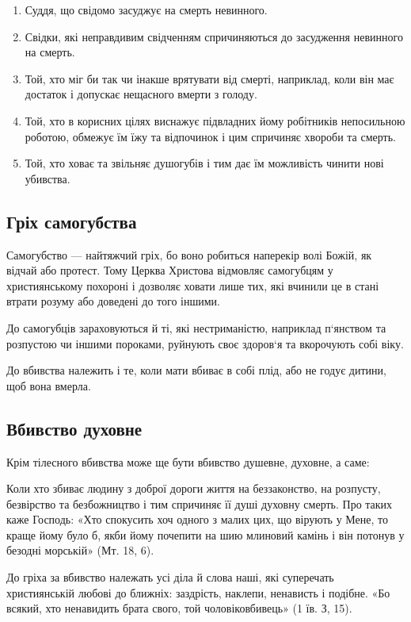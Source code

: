 \documentclass[main.tex]{subfiles}
\begin{document}
\begin{enumerate}
    \item Суддя, що свідомо засуджує на смерть невинного.
    \item Свідки, які неправдивим свідченням спричиняються до засудження невинного на смерть.
    \item Той, хто міг би так чи інакше врятувати від смерті, наприклад, коли він має достаток і допускає нещасного вмерти з голоду.
    \item Той, хто в корисних цілях виснажує підвладних йому робітників непосильною роботою, обмежує їм їжу та відпочинок і цим спричиняє хвороби та смерть.
    \item Той, хто ховає та звільняє душогубів і тим дає їм можливість чинити нові убивства.
\end{enumerate}

\subsection{Гріх самогубства}

Самогубство — найтяжчий гріх, бо воно робиться наперекір волі Божій, як відчай або протест. Тому Церква Христова відмовляє самогубцям у християнському похороні і дозволяє ховати лише тих, які вчинили це в стані втрати розуму або доведені до того іншими.

До самогубців зараховуються й ті, які нестриманістю, наприклад п`янством та розпустою чи іншими пороками, руйнують своє здоров`я та вкорочують собі віку.

До вбивства належить і те, коли мати вбиває в собі плід, або не годує дитини, щоб вона вмерла.

\subsection{Вбивство духовне}

Крім тілесного вбивства може ще бути вбивство душевне, духовне, а саме:

Коли хто збиває людину з доброї дороги життя на беззаконство, на розпусту, безвірство та безбожництво і тим спричиняє її душі духовну смерть. Про таких каже Господь: «Хто спокусить хоч одного з малих цих, що вірують у Мене, то краще йому було б, якби йому почепити на шию млиновий камінь і він потонув у безодні морській» (Мт. 18, 6).

До гріха за вбивство належать усі діла й слова наші, які суперечать християнській любові до ближніх: заздрість, наклепи, ненависть і подібне. «Бо всякий, хто ненавидить брата свого, той чоловіковбивець» (1 їв. З, 15).
\end{document}
